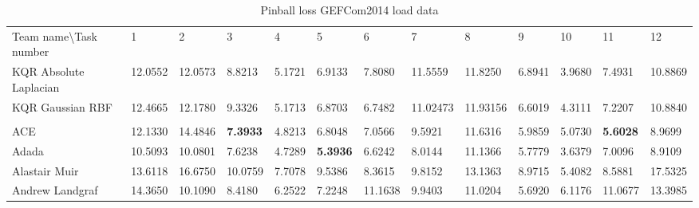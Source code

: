 \begin{table}[!ht]
    \caption{Pinball loss GEFCom2014 load data}
    \label{tab:pinball loss gefcom2014 load data}
    \begin{adjustbox}{width=\textwidth}
    \begin{tabular}{lllllllllllll}
      \toprule
      \midrule
      Team name\textbackslash Task number                       & 1                               & 2                                  & 3                               & 4                              & 5                              & 6       & 7                               & 8       & 9       & 10                             & 11                             & 12                              \\
  
  KQR Absolute Laplacian
  & 
  12.0552
  &
  12.0573
  &
  8.8213
  &
  5.1721
  &
  6.9133
  &
  7.8080
  &
  11.5559
  &
  11.8250
  &
  6.8941
  &
  3.9680
  &
  7.4931
  &
  10.8869
  \\
  KQR Gaussian RBF
  & 
  12.4665
  &
  12.1780
  &
  9.3326
  &
  5.1713
  &
  6.8703
  &
  6.7482
  &
  11.02473
  &
  11.93156
  &
  6.6019
  &
  4.3111
  &
  7.2207
  &
  10.8840
  \\
  \\
  ACE                        & 12.1330                         & 14.4846                         & \textbf{7.3933}                          & 4.8213                         & 6.8048                         & 7.0566  & 9.5921                          & 11.6316 & 5.9859  & 5.0730 & \textbf{5.6028}                         & 8.9699                          \\
  Adada                      & 10.5093                         & 10.0801                         & 7.6238                          & 4.7289                         & \textbf{5.3936}                         & 6.6242  & 8.0144                          & 11.1366 & 5.7779  & 3.6379                         & 7.0096                         & 8.9109                          \\
  Alastair Muir              & 13.6118                         & 16.6750                         & 10.0759                         & 7.7078 & 9.5386 & 8.3615  & 9.8152                          & 13.1363 & 8.9715  & 5.4082                         & 8.5881 & 17.5325                         \\
  Andrew Landgraf            & 14.3650                         & 10.1090                         & 8.4180                          & 6.2522                         & 7.2248                         & 11.1638 & 9.9403                          & 11.0204 & 5.6920  & 6.1176                         & 11.0677                        & 13.3985                         \\

\end{tabular}
\end{adjustbox}
\end{table}

